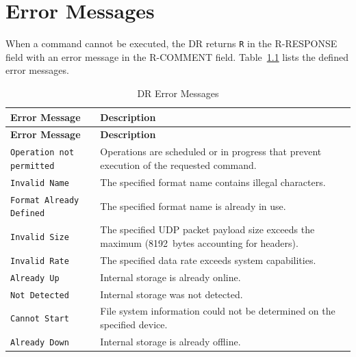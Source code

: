 
\chapter{Error Messages}
\label{app:errors}

When a command cannot be executed, the DR returns \texttt{R} in the R-RESPONSE
field with an error message in the R-COMMENT field.
Table~\ref{tab:errors} lists the defined error messages.

\begin{longtable}{l p{8cm}}
\caption{DR Error Messages}
\label{tab:errors} \\
\toprule
\textbf{Error Message} & \textbf{Description} \\
\midrule
\endfirsthead

\toprule
\textbf{Error Message} & \textbf{Description} \\
\midrule
\endhead

\bottomrule
\endfoot

\texttt{Operation not permitted}
    & Operations are scheduled or in progress that prevent execution
      of the requested command. \\

\texttt{Invalid Name}
    & The specified format name contains illegal characters. \\

\texttt{Format Already Defined}
    & The specified format name is already in use. \\

\texttt{Invalid Size}
    & The specified UDP packet payload size exceeds the maximum
      (8192~bytes accounting for headers). \\

\texttt{Invalid Rate}
    & The specified data rate exceeds system capabilities. \\

\texttt{Already Up}
    & Internal storage is already online. \\

\texttt{Not Detected}
    & Internal storage was not detected. \\

\texttt{Cannot Start}
    & File system information could not be determined on the
      specified device. \\

\texttt{Already Down}
    & Internal storage is already offline. \\


\end{longtable}

